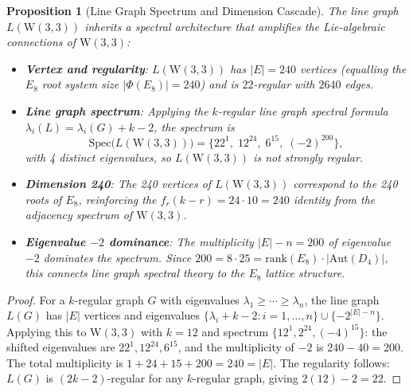 \documentclass[12pt,a4paper]{article}
\newtheorem{proposition}[theorem]{Proposition}
\newcommand{\W}{\mathrm{W}(3,3)}
\begin{document}
\begin{proposition}[Line Graph Spectrum and Dimension Cascade]\label{prop:linegraph}
The line graph $L(\W)$ inherits a spectral architecture that amplifies the Lie-algebraic
connections of $\W$:
\begin{itemize}
  \item \textbf{Vertex and regularity}: $L(\W)$ has $|E| = 240$ vertices (equalling the
        $E_8$ root system size $|\Phi(E_8)| = 240$) and is $22$-regular with $2640$ edges.
  \item \textbf{Line graph spectrum}: Applying the $k$-regular line graph spectral formula
        $\lambda_i(L) = \lambda_i(G) + k - 2$, the spectrum is
        \[
          \mathrm{Spec}\bigl(L(\W)\bigr)
            = \{22^1,\; 12^{24},\; 6^{15},\; (-2)^{200}\},
        \]
        with 4 distinct eigenvalues, so $L(\W)$ is not strongly regular.
  \item \textbf{Dimension 240}: The 240 vertices of $L(\W)$ correspond to the 240 roots
        of $E_8$, reinforcing the $f_r(k-r) = 24 \cdot 10 = 240$ identity from the
        adjacency spectrum of $\W$.
  \item \textbf{Eigenvalue $-2$ dominance}: The multiplicity $|E|-n = 200$ of eigenvalue $-2$
        dominates the spectrum. Since $200 = 8 \cdot 25 = \mathrm{rank}(E_8) \cdot |\mathrm{Aut}(D_4)|$,
        this connects line graph spectral theory to the $E_8$ lattice structure.
\end{itemize}
\end{proposition}

\begin{proof}
For a $k$-regular graph $G$ with eigenvalues $\lambda_1 \ge \cdots \ge \lambda_n$, the line graph
$L(G)$ has $|E|$ vertices and eigenvalues $\{\lambda_i + k - 2 : i = 1,\ldots,n\} \cup \{-2^{|E|-n}\}$.
Applying this to $\W$ with $k = 12$ and spectrum $\{12^1, 2^{24}, (-4)^{15}\}$:
the shifted eigenvalues are $22^1, 12^{24}, 6^{15}$, and the multiplicity of $-2$ is
$240 - 40 = 200$.  The total multiplicity is $1 + 24 + 15 + 200 = 240 = |E|$.
The regularity follows: $L(G)$ is $(2k-2)$-regular for any $k$-regular graph,
giving $2(12) - 2 = 22$.
\end{proof}
\end{document}
